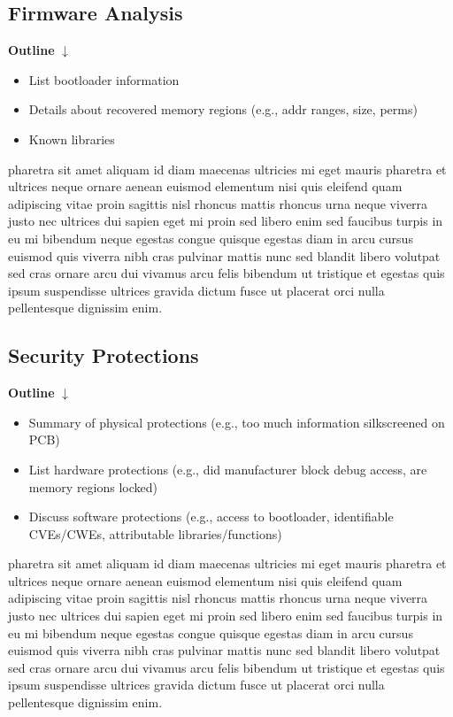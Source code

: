 \subsection{Firmware Analysis} \label{firmwareanalysis}

\textbf{Outline}
$\downarrow$

\begin{itemize}
    \item List bootloader information
    \item Details about recovered memory regions (e.g., addr ranges, size, perms)
    \item Known libraries
\end{itemize}

pharetra sit amet aliquam id diam maecenas ultricies mi eget mauris pharetra et ultrices neque ornare aenean euismod elementum nisi quis eleifend quam adipiscing vitae proin sagittis nisl rhoncus mattis rhoncus urna neque viverra justo nec ultrices dui sapien eget mi proin sed libero enim sed faucibus turpis in eu mi bibendum neque egestas congue quisque egestas diam in arcu cursus euismod quis viverra nibh cras pulvinar mattis nunc sed blandit libero volutpat sed cras ornare arcu dui vivamus arcu felis bibendum ut tristique et egestas quis ipsum suspendisse ultrices gravida dictum fusce ut placerat orci nulla pellentesque dignissim enim.

\subsection{Security Protections} \label{securityprotections}

\textbf{Outline}
$\downarrow$

\begin{itemize}
    \item Summary of physical protections (e.g., too much information silkscreened on PCB)
    \item List hardware protections (e.g., did manufacturer block debug access, are memory regions locked)
    \item Discuss software protections (e.g., access to bootloader, identifiable CVEs/CWEs, attributable libraries/functions)
\end{itemize}

pharetra sit amet aliquam id diam maecenas ultricies mi eget mauris pharetra et ultrices neque ornare aenean euismod elementum nisi quis eleifend quam adipiscing vitae proin sagittis nisl rhoncus mattis rhoncus urna neque viverra justo nec ultrices dui sapien eget mi proin sed libero enim sed faucibus turpis in eu mi bibendum neque egestas congue quisque egestas diam in arcu cursus euismod quis viverra nibh cras pulvinar mattis nunc sed blandit libero volutpat sed cras ornare arcu dui vivamus arcu felis bibendum ut tristique et egestas quis ipsum suspendisse ultrices gravida dictum fusce ut placerat orci nulla pellentesque dignissim enim.
